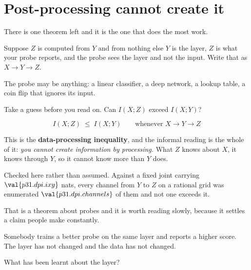 \section{Post-processing cannot create it}
\label{sec:P31-dpi}

\begin{fr}
There is one theorem left and it is the one that does the most work.

Suppose $Z$ is computed from $Y$ and from nothing else \dash{} $Y$ is the
layer, $Z$ is what your probe reports, and the probe sees the layer and not
the input. Write that as $X \to Y \to Z$.

The probe may be anything: a linear classifier, a deep network, a lookup
table, a coin flip that ignores its input.

Take a guess before you read on. Can $I(X; Z)$ exceed $I(X; Y)$?
\dotline
\nextframe
\end{fr}

\begin{fr}

\[ I(X; Z) \;\le\; I(X; Y) \qquad \text{whenever } X \to Y \to Z \]

This is the \textbf{data-processing inequality}, and the informal reading is
the whole of it: \emph{you cannot create information by processing.} What
$Z$ knows about $X$, it knows through $Y$, so it cannot know more than $Y$
does.

Checked here rather than assumed. Against a fixed joint carrying
$\val{p31.dpi.ixy}$ nats, every channel from $Y$ to $Z$ on a rational grid
was enumerated \dash{} $\val{p31.dpi.channels}$ of them \dash{} and not one
exceeds it.
\end{fr}

\begin{fr}
That is a theorem about probes and it is worth reading slowly, because it
settles a claim people make constantly.

Somebody trains a better probe on the same layer and reports a higher score.
The layer has not changed and the data has not changed.

What has been learnt about the layer?
\dotline
\nextframe
\end{fr}

